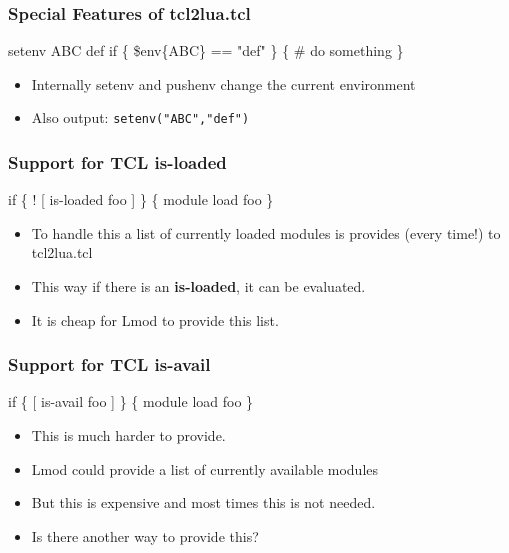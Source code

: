 \documentclass{beamer}
\begin{document}
\begin{frame}[fragile]
    \frametitle{Special Features of tcl2lua.tcl}
 {\tiny
    \begin{semiverbatim}
setenv ABC def
if \{ \$env\{ABC\} == "def" \} \{
     # do something
\}
    \end{semiverbatim}
}
  \begin{itemize}
    \item Internally setenv and pushenv change the current environment
    \item Also output: \texttt{setenv("ABC","def")}
  \end{itemize}

\end{frame}



\begin{frame}[fragile]
    \frametitle{Support for TCL is-loaded}
 {\tiny
    \begin{semiverbatim}
if \{ ! [ is-loaded foo ] \} \{
   module load foo
\}
        
    \end{semiverbatim}
}
  \begin{itemize}
    \item To handle this a list of currently loaded modules is
      provides (every time!) to tcl2lua.tcl
    \item This way if there is an \textbf{is-loaded}, it can be evaluated.
    \item It is cheap for Lmod to provide this list.
  \end{itemize}
\end{frame}

\begin{frame}[fragile]
    \frametitle{Support for TCL is-avail}
 {\tiny
    \begin{semiverbatim}
if \{ [ is-avail foo ] \} \{
   module load foo
\}
    \end{semiverbatim}
}
  \begin{itemize}
    \item This is much harder to provide.
    \item Lmod could provide a list of currently available modules
    \item But this is expensive and most times this is not needed.
    \item Is there another way to provide this?
  \end{itemize}
\end{frame}
\end{document}
